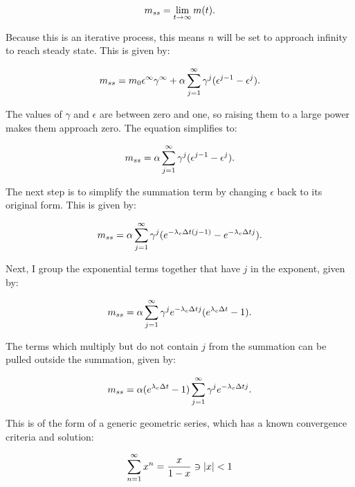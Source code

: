 \begin{equation} \hfill
m_{ss} = \lim_{t \rightarrow \infty} m(t).
\hfill \end{equation}

Because this is an iterative process, this means $n$ will be set to approach infinity to reach steady state.
This is given by:

\begin{equation} \hfill
m_{ss} = m_0 \epsilon^{\infty} \gamma^{\infty} + \alpha \sum_{j=1}^{\infty} \gamma^j (\epsilon^{j-1} - \epsilon^j).
\hfill \end{equation}

The values of $\gamma$ and $\epsilon$ are between zero and one, so raising them to a large power makes them approach zero. The equation simplifies to:
 
\begin{equation} \hfill
m_{ss} = \alpha \sum_{j=1}^{\infty} \gamma^j (\epsilon^{j-1} - \epsilon^j).
\hfill \end{equation}

The next step is to simplify the summation term by changing $\epsilon$ back to its original form.
This is given by:

\begin{equation} \hfill
m_{ss} = \alpha \sum_{j=1}^{\infty} \gamma^j (e^{-\lambda_c \Delta t (j-1)} - e^{-\lambda_c \Delta t j}).
\hfill \end{equation}

Next, I group the exponential terms together that have $j$ in the exponent, given by:

\begin{equation} \hfill
m_{ss} = \alpha \sum_{j=1}^{\infty} \gamma^j e^{-\lambda_c \Delta t j} (e^{\lambda_c \Delta t} - 1).
\hfill \end{equation}

The terms which multiply but do not contain $j$ from the summation can be pulled outside the summation, given by:

\begin{equation} \hfill
m_{ss} = \alpha (e^{\lambda_c \Delta t} - 1) \sum_{j=1}^{\infty} \gamma^j e^{-\lambda_c \Delta t j}.
\hfill \end{equation}

This is of the form of a generic geometric series, which has a known convergence criteria and solution:

\begin{equation} \hfill
\sum_{n=1}^{\infty} x^n = \frac{x}{1-x} \ni |x| < 1
\hfill \end{equation}

